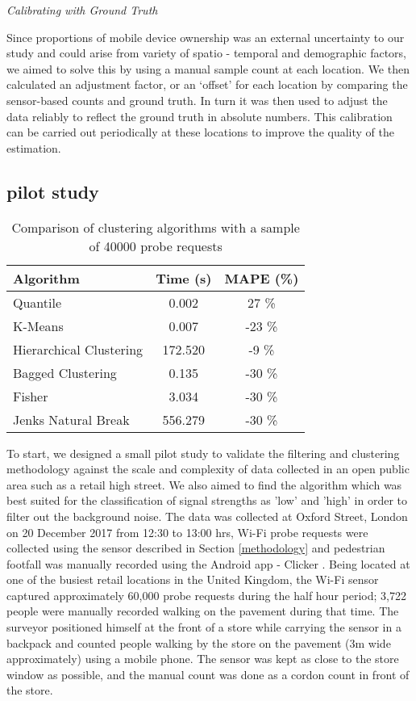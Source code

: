 \vspace{1.5em}\noindent\textit{Calibrating with Ground Truth}\vspace{0.5em}

Since proportions of mobile device ownership was an external uncertainty to our study and could arise from variety of spatio - temporal and demographic factors, we aimed to solve this by using a manual sample count at each location.
We then calculated an adjustment factor, or an `offset' for each location by comparing the sensor-based counts and ground truth.
In turn it was then used to adjust the data reliably to reflect the ground truth in absolute numbers.
This calibration can be carried out periodically at these locations to improve the quality of the estimation.


\subsection{pilot study}

\begin{table}
\caption{Comparison of clustering algorithms with a sample of 40000 probe requests}
{\begin{tabular}{lcc} 
	\toprule
	 Algorithm					& Time (s) 	& MAPE (\%) \\
	\midrule
	 Quantile					& 0.002 	&  27 \% \\
	 K-Means			 		& 0.007 	& -23 \% \\
	 Hierarchical Clustering	& 172.520 	&  -9 \% \\
	 Bagged Clustering 			& 0.135 	& -30 \% \\
	 Fisher 					& 3.034 	& -30 \% \\
	 Jenks Natural Break 		& 556.279 	& -30 \% \\
	 \bottomrule
\end{tabular}}
\label{classification-table}
\end{table}

To start, we designed a small pilot study to validate the filtering and clustering methodology against the scale and complexity of data collected in an open public area such as a retail high street.
We also aimed to find the algorithm which was best suited for the classification of signal strengths as 'low' and 'high' in order to filter out the background noise.
The data was collected at Oxford Street, London on 20 December 2017 from 12:30 to 13:00 hrs, Wi-Fi probe requests were collected using the sensor described in Section \ref{methodology} and pedestrian footfall was manually recorded using the Android app - Clicker \citep{bala2018}.
Being located at one of the busiest retail locations in the United Kingdom, the Wi-Fi sensor captured approximately 60,000 probe requests during the half hour period; 3,722 people were manually recorded walking on the pavement during that time.
The surveyor positioned himself at the front of a store while carrying the sensor in a backpack and counted people walking by the store on the pavement (3m wide approximately) using a mobile phone.
The sensor was kept as close to the store window as possible, and the manual count was done as a cordon count in front of the store.

